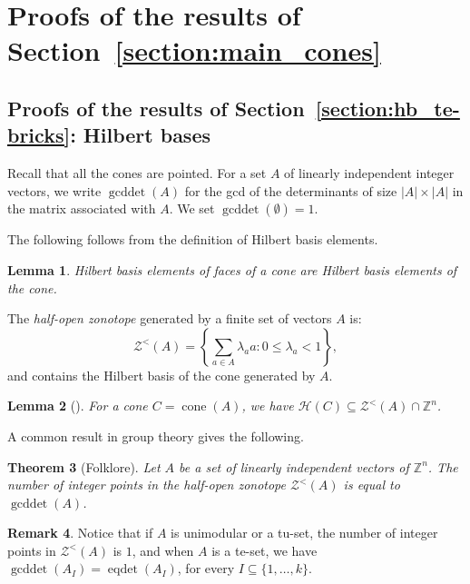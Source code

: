\documentclass[11pt,a4paper]{amsart}
\renewcommand*{\leq}{\leqslant}
\theoremstyle{plain}
\newtheorem{theorem}{Theorem}[section]%
\newtheorem{lemma}[theorem]{Lemma}
\theoremstyle{definition}
\newtheorem{remark}[theorem]{Remark}
\newcommand{\cal}[1]{\mathcal{#1}}
\newcommand{\Z}{\mathbb{Z}}
\DeclareMathOperator{\cone}{cone}
\DeclareMathOperator{\eqdet}{eqdet}
\DeclareMathOperator{\gcddet}{gcddet}
\renewcommand{\cal}[1]{\mathcal{#1}}
\begin{document}
\section{Proofs of the results of Section~\ref{section:main_cones}}\label{section:proofs_cones}

\subsection{Proofs of the results of Section~\ref{section:hb_te-bricks}{: Hilbert bases}}

Recall that all the cones are pointed.
For a set $A$ of linearly independent integer vectors, we write $\gcddet(A)$ for the gcd of the determinants of size $|A|\times|A|$ in the matrix associated with $A$.
We set $\gcddet(\emptyset) = 1$.
\medskip

The following follows from the definition of Hilbert basis elements.
\begin{lemma}\label{lemma:face_Hilbert}
Hilbert basis elements of faces of a cone are Hilbert basis elements of the cone.
\end{lemma}
The \emph{half-open zonotope} generated by a finite set of vectors $A$ is:
$$\cal{Z}^<(A) = \left\{\sum_{a\in A} \lambda_a a \colon 0\leq\lambda_a< 1\right\},$$
and contains the Hilbert basis of the cone generated by $A$.
\begin{lemma}[\cite{Sebo_1990}]\label{lemma:nontrivial_Hilb_zono} 
For a cone $C=\cone (A)$, we have $\cal H(C)\subseteq\cal{Z}^<(A)\cap \Z^n$.
\end{lemma}

A common result in group theory gives the following.
\begin{theorem}[Folklore] \label{theorem:nbr_points_zono}
Let $A$ be a set of linearly independent vectors of $\Z^n$.
The number of integer points in the half-open zonotope $\cal Z^<(A)$ is equal to $\gcddet(A)$.
\end{theorem}
\begin{remark}
Notice that if $A$ is unimodular or a tu-set, the number of integer points in $\cal Z^<(A)$ is $1$,
and when $A$ is a te-set, we have $\gcddet(A_I)=\eqdet(A_I)$, for every $I\subseteq\{1,\ldots,k\}$.
\end{remark}
\end{document}
